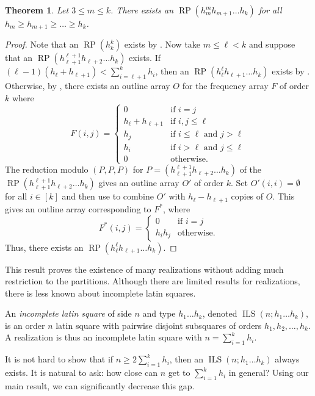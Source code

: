 \documentclass{sn-jnl}
\newtheorem{theorem}{Theorem}[section]
\theoremstyle{definition}
\DeclareMathOperator{\LS}{RP}
\DeclareMathOperator{\ILS}{ILS}
\begin{document}
\begin{theorem}
\label{thm: main}
    Let $3\leq m\leq k$. There exists an $\LS(h_m^mh_{m+1}\dots h_k)$ for all $h_m\geq h_{m+1}\geq\dots\geq h_k$.
\end{theorem}
\begin{proof}
    Note that an $\LS(h_k^k)$ exists by . Now take $m\leq \ell<k$ and suppose that an $\LS(h_{\ell+1}^{\ell+1}h_{\ell+2}\dots h_k)$ exists. If $(\ell-1)(h_{\ell}+h_{\ell+1})<\sum_{i=\ell+1}^kh_i$, then an $\LS(h_\ell^\ell h_{\ell+1}\dots h_k)$ exists by . Otherwise, by , there exists an outline array $O$ for the frequency array $F$ of order $k$ where
    $$F(i,j) = \begin{cases}
        0 & \text{if $i=j$}\\
        h_\ell+h_{\ell+1} & \text{if $i,j\leq \ell$}\\
        h_{j} & \text{if $i\leq \ell$ and $j>\ell$}\\
        h_{i} & \text{if $i>\ell$ and $j\leq \ell$}\\
        0 & \text{otherwise.}
    \end{cases}$$
    The reduction modulo $(P,P,P)$ for $P=(h_{\ell+1}^{\ell+1}h_{\ell+2}\dots h_k)$ of the $\LS(h_{\ell+1}^{\ell+1}h_{\ell+2}\dots h_k)$ gives an outline array $O'$ of order $k$. Set $O'(i,i) = \emptyset$ for all $i\in[k]$ and then use  to combine $O'$ with $h_\ell-h_{\ell+1}$ copies of $O$. This gives an outline array corresponding to $F^*$, where
    $$F^*(i,j) = \begin{cases}
        0 & \text{if $i=j$}\\
        h_ih_j & \text{otherwise.}
    \end{cases}$$
    Thus, there exists an $\LS(h_\ell^\ell h_{\ell+1}\dots h_k)$.
\end{proof}

This result proves the existence of many realizations without adding much restriction to the partitions. Although there are limited results for realizations, there is less known about incomplete latin squares.

An \emph{incomplete latin square} of side $n$ and type $h_1\dots h_k$, denoted $\ILS(n;h_1\dots h_k)$, is an order $n$ latin square with pairwise disjoint subsquares of orders $h_1,h_2,\dots, h_k$. A realization is thus an incomplete latin square with $n = \sum_{i=1}^kh_i$.

It is not hard to show that if $n\geq 2\sum_{i=1}^kh_i$, then an $\ILS(n;h_1\dots h_k)$ always exists. It is natural to ask: how close can $n$ get to $\sum_{i=1}^kh_i$ in general? Using our main result, we can significantly decrease this gap.
\end{document}
